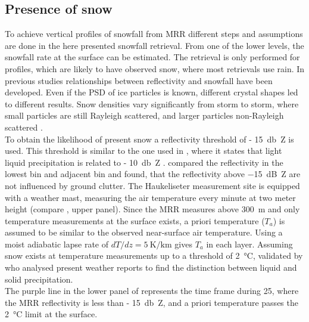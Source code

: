 \subsection{Presence of snow}\label{sec:pre_snow}

To achieve vertical profiles of snowfall from MRR different steps and assumptions are done in the here presented snowfall retrieval. From one of the lower levels, the snowfall rate at the surface can be estimated. The retrieval is only performed for profiles, which are likely to have observed snow, where most retrievals use rain. In previous studies relationships between reflectivity and snowfall have been developed. Even if the PSD of ice particles is known, different crystal shapes led to different results. Snow densities vary significantly from storm to storm, where small particles are still Rayleigh scattered, and larger particles non-Rayleigh scattered \citep{gunn_microwave_1954}. 
\\
To obtain the likelihood of present snow a reflectivity threshold of \SI{- 15}{\decibel Z} is used. This threshold is similar to the one used in \citet{wood_level_2013}, where it states that light liquid precipitation is related to \SI{- 10}{\decibel Z} \citep{stephens_properties_2007}. \citet{wood_estimation_2011} compared the reflectivity in the lowest bin and adjacent bin and found, that the reflectivity above \SI{-15}{\dB Z} are not influenced by ground clutter.
\newline
The Haukeliseter measurement site is equipped with a weather mast, measuring the air temperature every minute at two meter height (compare , upper panel). 
%
Since the MRR measures above \SI{300}{\metre} and only temperature measurements at the surface exists, a priori temperature ($T_{a}$) is assumed to be similar to the observed near-surface air temperature. Using a moist adiabatic lapse rate of $dT/dz = \SI{5}{\kelvin\per\km}$ gives $T_{a}$ in each layer. 
Assuming snow exists at temperature measurements up to a threshold of \SI{2}{\celsius}, validated by \citet{liu_g._deriving_2008} who analysed present weather reports to find the distinction between liquid and solid precipitation.\\
The purple line in the lower panel of  represents the time frame during \SI{25}{\dec}, where the MRR reflectivity is less than \SI{- 15}{\decibel Z}, and a priori temperature passes the \SI{2}{\celsius} limit at the surface.  

